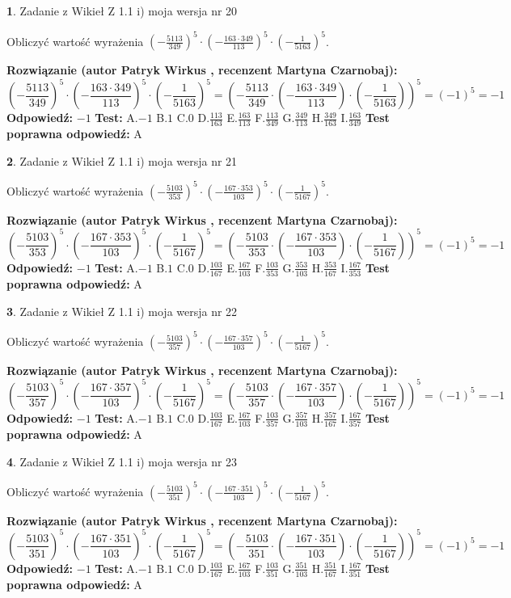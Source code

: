 \documentclass[12pt, a4paper]{article}
\theoremstyle{definition} %
\newtheorem{zad}{}
\newcommand{\zadStart}[1]{\begin{zad}#1\newline}
\newcommand{\zadStop}{\end{zad}}
\newcommand{\rozwStart}[2]{\noindent \textbf{Rozwiązanie (autor #1 , recenzent #2): }\newline}
\newcommand{\rozwStop}{\newline}
\newcommand{\odpStart}{\noindent \textbf{Odpowiedź:}\newline}
\newcommand{\odpStop}{\newline}
\newcommand{\testStart}{\noindent \textbf{Test:}\newline}
\newcommand{\testStop}{\newline}
\newcommand{\kluczStart}{\noindent \textbf{Test poprawna odpowiedź:}\newline}
\newcommand{\kluczStop}{\newline}
\begin{document}
\zadStart{Zadanie z Wikieł Z 1.1 i) moja wersja nr 20}

Obliczyć wartość wyrażenia $(-\frac{5113}{349})^{5} \cdot (-\frac{163 \cdot 349}{113})^{5} \cdot (-\frac{1}{5163})^{5}$.
\zadStop
\rozwStart{Patryk Wirkus}{Martyna Czarnobaj}
$$(-\frac{5113}{349})^{5} \cdot (-\frac{163 \cdot 349}{113})^{5} \cdot (-\frac{1}{5163})^{5} = (-\frac{5113}{349} \cdot (-\frac{163 \cdot 349}{113}) \cdot (-\frac{1}{5163}))^{5} = (-1)^{5} = -1$$
\rozwStop
\odpStart
$-1$
\odpStop
\testStart
A.$-1$ B.$1$ C.$0$ D.$\frac{113}{163}$ E.$\frac{163}{113}$
F.$\frac{113}{349}$ G.$\frac{349}{113}$
H.$\frac{349}{163}$
I.$\frac{163}{349}$
\testStop
\kluczStart
A
\kluczStop



\zadStart{Zadanie z Wikieł Z 1.1 i) moja wersja nr 21}

Obliczyć wartość wyrażenia $(-\frac{5103}{353})^{5} \cdot (-\frac{167 \cdot 353}{103})^{5} \cdot (-\frac{1}{5167})^{5}$.
\zadStop
\rozwStart{Patryk Wirkus}{Martyna Czarnobaj}
$$(-\frac{5103}{353})^{5} \cdot (-\frac{167 \cdot 353}{103})^{5} \cdot (-\frac{1}{5167})^{5} = (-\frac{5103}{353} \cdot (-\frac{167 \cdot 353}{103}) \cdot (-\frac{1}{5167}))^{5} = (-1)^{5} = -1$$
\rozwStop
\odpStart
$-1$
\odpStop
\testStart
A.$-1$ B.$1$ C.$0$ D.$\frac{103}{167}$ E.$\frac{167}{103}$
F.$\frac{103}{353}$ G.$\frac{353}{103}$
H.$\frac{353}{167}$
I.$\frac{167}{353}$
\testStop
\kluczStart
A
\kluczStop



\zadStart{Zadanie z Wikieł Z 1.1 i) moja wersja nr 22}

Obliczyć wartość wyrażenia $(-\frac{5103}{357})^{5} \cdot (-\frac{167 \cdot 357}{103})^{5} \cdot (-\frac{1}{5167})^{5}$.
\zadStop
\rozwStart{Patryk Wirkus}{Martyna Czarnobaj}
$$(-\frac{5103}{357})^{5} \cdot (-\frac{167 \cdot 357}{103})^{5} \cdot (-\frac{1}{5167})^{5} = (-\frac{5103}{357} \cdot (-\frac{167 \cdot 357}{103}) \cdot (-\frac{1}{5167}))^{5} = (-1)^{5} = -1$$
\rozwStop
\odpStart
$-1$
\odpStop
\testStart
A.$-1$ B.$1$ C.$0$ D.$\frac{103}{167}$ E.$\frac{167}{103}$
F.$\frac{103}{357}$ G.$\frac{357}{103}$
H.$\frac{357}{167}$
I.$\frac{167}{357}$
\testStop
\kluczStart
A
\kluczStop



\zadStart{Zadanie z Wikieł Z 1.1 i) moja wersja nr 23}

Obliczyć wartość wyrażenia $(-\frac{5103}{351})^{5} \cdot (-\frac{167 \cdot 351}{103})^{5} \cdot (-\frac{1}{5167})^{5}$.
\zadStop
\rozwStart{Patryk Wirkus}{Martyna Czarnobaj}
$$(-\frac{5103}{351})^{5} \cdot (-\frac{167 \cdot 351}{103})^{5} \cdot (-\frac{1}{5167})^{5} = (-\frac{5103}{351} \cdot (-\frac{167 \cdot 351}{103}) \cdot (-\frac{1}{5167}))^{5} = (-1)^{5} = -1$$
\rozwStop
\odpStart
$-1$
\odpStop
\testStart
A.$-1$ B.$1$ C.$0$ D.$\frac{103}{167}$ E.$\frac{167}{103}$
F.$\frac{103}{351}$ G.$\frac{351}{103}$
H.$\frac{351}{167}$
I.$\frac{167}{351}$
\testStop
\kluczStart
A
\kluczStop
\end{document}
